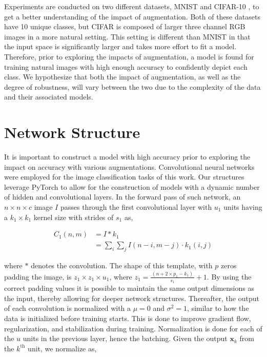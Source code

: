 \documentclass[conference]{IEEEtran}
\newcommand{\xv}{\mathbf{x}}
\begin{document}
Experiments are conducted on two different datasets, MNIST \cite{MNIST} and CIFAR-10 \cite{CIFAR10}, to get a better understanding of the impact of augmentation. Both of these datasets have 10 unique classes, but CIFAR is composed of larger three channel RGB images in a more natural setting. This setting is different than MNIST in that the input space is significantly larger and takes more effort to fit a model. Therefore, prior to exploring the impacts of augmentation, a model is found for training natural images with high enough accuracy to confidently depict each class. We hypothesize that both the impact of augmentation, as well as the degree of robustness, will vary between the two due to the complexity of the data and their associated models.

\section{Network Structure}

It is important to construct a model with high accuracy prior to exploring the impact on accuracy with various augmentations. Convolutional neural networks were employed for the image classification tasks of this work. Our structures leverage PyTorch to allow for the construction of models with a dynamic number of hidden and convolutional layers. In the forward pass of such network, an $n \times n \times c$ image $I$ passes through the first convolutional layer with $u_1$ units having a $k_1 \times k_1$ kernel size with strides of $s_1$ as,

\begin{align*}
C_1(n, m) &= I * k_1 \\
&= \sum_i{\sum_j{I(n - i, m - j) \cdot k_1(i, j)}}
\end{align*}

\noindent
where $*$ denotes the convolution. The shape of this template, with $p$ zeros padding the image, is $z_1 \times z_1 \times u_1$, where $z_1 = \frac{\,( n + 2\times p_1 - k_1 )\,}{\,s_1 \,}+ 1$. By using the correct padding values it is possible to maintain the same output dimensions as the input, thereby allowing for deeper network structures. Thereafter, the output of each convolution is normalized with a $\mu = 0$ and $\sigma^2 = 1$, similar to how the data is initialized before training starts. This is done to improve gradient flow, regularization, and stabilization during training. Normalization is done for each of the $u$ units in the previous layer, hence the batching. Given the output $\xv_k$ from the $k^{\text{th}}$ unit, we normalize as,
\end{document}
